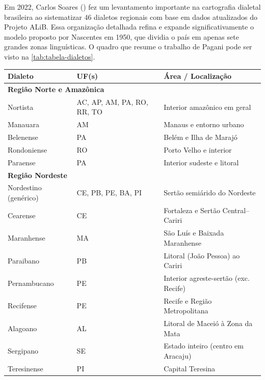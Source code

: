 Em 2022, Carlos Soares (\citeyear{pagani2022}) fez um levantamento importante na cartografia dialetal brasileira ao sistematizar 46 dialetos regionais com base em dados atualizados do Projeto ALiB. Essa organização detalhada refina e expande significativamente o modelo proposto por Nascentes em 1950, que dividia o país em apenas sete grandes zonas linguísticas. 
O quadro que resume o trabalho de Pagani pode ser visto na \autoref{tab:tabela-dialetos}.

 
\begin{table}[ht]
\centering
\tiny
\setlength{\tabcolsep}{6pt}
\begin{tabular}{lll}
\hline
\textbf{Dialeto} & \textbf{UF(s)} & \textbf{Área / Localização} \\
\hline
\multicolumn{3}{l}{

\textbf{Região Norte e Amazônica}} \\ \hline
Nortista    & AC, AP, AM, PA, RO, RR, TO & Interior amazônico em geral \\
Manauara    & AM                         & Manaus e entorno urbano     \\
Belenense   & PA                         & Belém e Ilha de Marajó      \\
Rondoniense & RO                         & Porto Velho e interior      \\
Paraense    & PA                         & Interior sudeste e litoral  \\
\hline
\multicolumn{3}{l}{\textbf{Região Nordeste}} \\ \hline
Nordestino (genérico) & CE, PB, PE, BA, PI & Sertão semiárido do Nordeste       \\
Cearense              & CE                  & Fortaleza e Sertão Central–Cariri  \\
Maranhense            & MA                  & São Luís e Baixada Maranhense     \\
Paraibano             & PB                  & Litoral (João Pessoa) ao Cariri    \\
Pernambucano          & PE                  & Interior agreste-sertão (exc. Recife) \\
Recifense             & PE                  & Recife e Região Metropolitana      \\
Alagoano              & AL                  & Litoral de Maceió à Zona da Mata   \\
Sergipano             & SE                  & Estado inteiro (centro em Aracaju) \\
Teresinense           & PI                  & Capital Teresina                   \\

\end{tabular}
\end{table}
